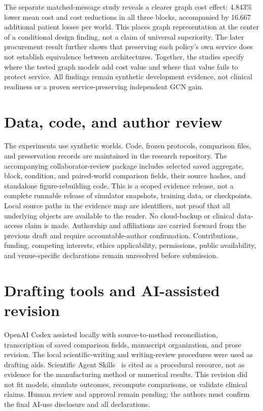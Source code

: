 \documentclass[preprint,12pt]{elsarticle}
\begin{document}
The separate matched-message study reveals a clearer graph cost effect:
4.843\% lower mean cost and cost reductions in all three blocks, accompanied by
16.667 additional patient losses per world. This places graph representation
at the center of a conditional design finding, not a claim of universal
superiority. The later procurement result further shows that preserving each
policy's own service does not establish equivalence between architectures.
Together, the studies specify where the tested graph models add cost value and
where that value fails to protect service. All findings remain synthetic
development evidence, not clinical readiness or a proven service-preserving
independent GCN gain.

\section*{Data, code, and author review}
The experiments use synthetic worlds. Code, frozen protocols, comparison files,
and preservation records are maintained in the research repository. The
accompanying collaborator-review package includes selected saved aggregate,
block, condition, and paired-world comparison fields, their source hashes, and
standalone figure-rebuilding code. This is a scoped evidence release, not a
complete runnable release of simulator snapshots, training data, or checkpoints.
Local source paths in the evidence map are identifiers, not proof that all
underlying objects are available to the reader. No cloud-backup or clinical
data-access claim is made. Authorship and affiliations are carried forward from the previous
draft and require accountable-author confirmation. Contributions, funding,
competing interests, ethics applicability, permissions, public availability,
and venue-specific declarations remain unresolved before submission.

\section*{Drafting tools and AI-assisted revision}
OpenAI Codex assisted locally with source-to-method reconciliation, transcription
of saved comparison fields, manuscript organization, and prose revision.
The local scientific-writing and writing-review procedures were used as
drafting aids. Scientific Agent Skills~\cite{Kassis2026} is cited as a procedural
resource, not as evidence for the manufacturing method or numerical results.
This revision did not fit models, simulate outcomes, recompute comparisons,
or validate clinical claims. Human review and approval remain pending; the
authors must confirm the final AI-use disclosure and all declarations.
\end{document}
